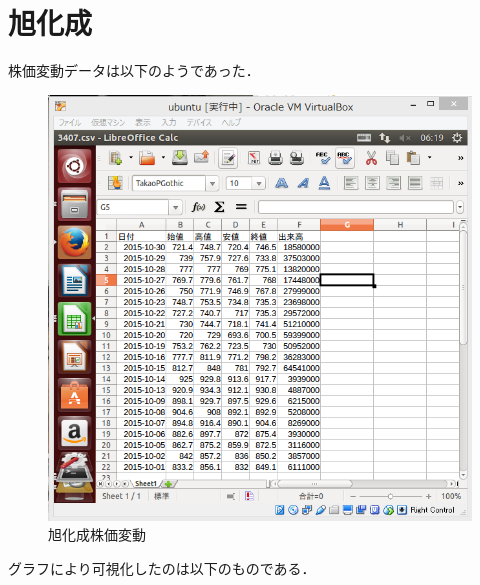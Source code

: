 {\section{旭化成}



株価変動データは以下のようであった．


\begin{figure}[H]
\centering
\includegraphics[width=15cm]{3407csv.PNG}
\caption{旭化成株価変動}\label{サンプル図}
\end{figure}


グラフにより可視化したのは以下のものである．




}
